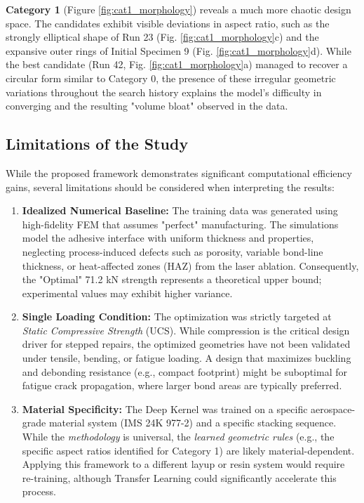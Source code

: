 \documentclass[
  preprint,
  12pt,
  a4paper
]{elsarticle}
\newcommand{\new}[1]{#1}
\begin{document}
\textbf{Category 1} (Figure \ref{fig:cat1_morphology}) reveals a much more chaotic design space. The candidates exhibit visible deviations in aspect ratio, such as the strongly elliptical shape of Run 23 (Fig. \ref{fig:cat1_morphology}c) and the expansive outer rings of Initial Specimen 9 (Fig. \ref{fig:cat1_morphology}d). While the best candidate (Run 42, Fig. \ref{fig:cat1_morphology}a) managed to recover a circular form similar to Category 0, the presence of these irregular geometric variations throughout the search history explains the model's difficulty in converging and the resulting "volume bloat" observed in the data.

\subsection{Limitations of the Study}
\label{sec:limitations}

While the proposed framework demonstrates significant \new{computational efficiency} gains, several limitations should be considered when interpreting the results:

\begin{enumerate}
    \item \textbf{Idealized Numerical Baseline:} The training data was generated using high-fidelity FEM that assumes "perfect" manufacturing. The simulations model the adhesive interface with uniform thickness and properties, neglecting process-induced defects such as porosity, variable bond-line thickness, or heat-affected zones (HAZ) from the laser ablation. Consequently, the "Optimal" 71.2 kN strength represents a theoretical upper bound; experimental values may exhibit higher variance.
    
    \item \textbf{Single Loading Condition:} The optimization was strictly targeted at \textit{Static Compressive Strength} (UCS). While compression is the critical design driver for stepped repairs, the optimized geometries have not been validated under tensile, bending, or fatigue loading. A design that maximizes buckling and debonding resistance (e.g., compact footprint) might be suboptimal for fatigue crack propagation, where larger bond areas are typically preferred.
    
    \item \textbf{Material Specificity:} The Deep Kernel was trained on a specific aerospace-grade material system (IMS 24K 977-2) and a specific stacking sequence. While the \textit{methodology} is universal, the \textit{learned geometric rules} (e.g., the specific aspect ratios identified for Category 1) are likely material-dependent. Applying this \new{framework} to a different layup or resin system would require re-training, although Transfer Learning could significantly accelerate this process.
\end{enumerate}
\end{document}
